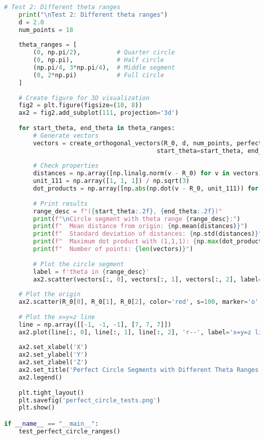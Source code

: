 \begin{lstlisting}[language=Python]
    # Test 2: Different theta ranges
    print("\nTest 2: Different theta ranges")
    d = 2.0
    num_points = 18
    
    theta_ranges = [
        (0, np.pi/2),          # Quarter circle
        (0, np.pi),            # Half circle
        (np.pi/4, 3*np.pi/4),  # Middle segment
        (0, 2*np.pi)           # Full circle
    ]
    
    # Create figure for 3D visualization
    fig2 = plt.figure(figsize=(10, 8))
    ax2 = fig2.add_subplot(111, projection='3d')
    
    for start_theta, end_theta in theta_ranges:
        # Generate vectors
        vectors = create_orthogonal_vectors(R_0, d, num_points, perfect=True, 
                                          start_theta=start_theta, end_theta=end_theta)
        
        # Check properties
        distances = np.array([np.linalg.norm(v - R_0) for v in vectors])
        unit_111 = np.array([1, 1, 1]) / np.sqrt(3)
        dot_products = np.array([np.abs(np.dot(v - R_0, unit_111)) for v in vectors])
        
        # Print results
        range_desc = f"({start_theta:.2f}, {end_theta:.2f})"
        print(f"\nCircle segment with theta range {range_desc}:")
        print(f"  Mean distance from origin: {np.mean(distances)}")
        print(f"  Standard deviation of distances: {np.std(distances)}")
        print(f"  Maximum dot product with (1,1,1): {np.max(dot_products)}")
        print(f"  Number of points: {len(vectors)}")
        
        # Plot the circle segment
        label = f'theta in {range_desc}'
        ax2.scatter(vectors[:, 0], vectors[:, 1], vectors[:, 2], label=label)
    
    # Plot the origin
    ax2.scatter(R_0[0], R_0[1], R_0[2], color='red', s=100, marker='o', label='Origin R_0')
    
    # Plot the x=y=z line
    line = np.array([[-1, -1, -1], [7, 7, 7]])
    ax2.plot(line[:, 0], line[:, 1], line[:, 2], 'r--', label='x=y=z line')
    
    ax2.set_xlabel('X')
    ax2.set_ylabel('Y')
    ax2.set_zlabel('Z')
    ax2.set_title('Perfect Circle Segments with Different Theta Ranges')
    ax2.legend()
    
    plt.tight_layout()
    plt.savefig('perfect_circle_tests.png')
    plt.show()

if __name__ == "__main__":
    test_perfect_circle_ranges()
\end{lstlisting}

